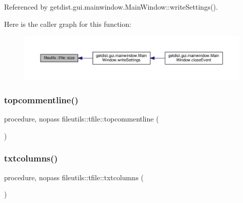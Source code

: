 Referenced by getdist.\+gui.\+mainwindow.\+Main\+Window\+::write\+Settings().

Here is the caller graph for this function\+:
\nopagebreak
\begin{figure}[H]
\begin{center}
\leavevmode
\includegraphics[width=350pt]{structfileutils_1_1tfile_ab109150a80fd9a3e7e9891127698d592_icgraph}
\end{center}
\end{figure}
\mbox{\label{structfileutils_1_1tfile_a6f71b4071c45a6d9a4b170673e57d07d}} 
\subsubsection{\texorpdfstring{topcommentline()}{topcommentline()}}
{\footnotesize\ttfamily procedure, nopass fileutils\+::tfile\+::topcommentline (\begin{DoxyParamCaption}{ }\end{DoxyParamCaption})\hspace{0.3cm}{\ttfamily [private]}}

\mbox{\label{structfileutils_1_1tfile_a3be117fe85987362f1fe7aadaf3b750d}} 
\subsubsection{\texorpdfstring{txtcolumns()}{txtcolumns()}}
{\footnotesize\ttfamily procedure, nopass fileutils\+::tfile\+::txtcolumns (\begin{DoxyParamCaption}{ }\end{DoxyParamCaption})\hspace{0.3cm}{\ttfamily [private]}}

\mbox{\label{structfileutils_1_1tfile_a569e8eb7461473f94ed44e5299f9fa3d}} 

